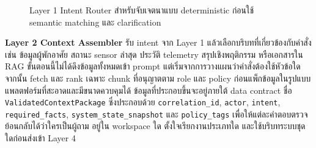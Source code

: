 \begin{figure}[!htbp]
    \centering
    \caption{Layer 1 Intent Router สำหรับจับเจตนาแบบ deterministic ก่อนใช้ semantic matching และ clarification}
    \label{fig:ch3_ai_intent_router}
\end{figure}
\FloatBarrier

\textbf{Layer 2 Context Assembler} รับ intent จาก Layer 1 แล้วเลือกบริบทที่เกี่ยวข้องกับคำสั่ง เช่น ข้อมูลผู้พักอาศัย สถานะ sensor ล่าสุด ประวัติ telemetry สรุปเชิงพฤติกรรม หรือเอกสารใน RAG ขั้นตอนนี้ไม่ได้ดึงข้อมูลทั้งหมดเข้า prompt แต่เริ่มจากการวางแผนว่าคำสั่งต้องใช้หัวข้อใด จากนั้น fetch และ rank เฉพาะ chunk ที่อนุญาตตาม role และ policy ก่อนแพ็กข้อมูลในรูปแบบแพลตฟอร์มที่สะอาดและมีขนาดควบคุมได้ ข้อมูลที่ประกอบขึ้นจะอยู่ภายใต้ data contract ชื่อ \texttt{ValidatedContextPackage} ซึ่งประกอบด้วย \texttt{correlation\_id}, \texttt{actor}, \texttt{intent}, \texttt{required\_facts}, \texttt{system\_state\_snapshot} และ \texttt{policy\_tags} เพื่อให้แต่ละคำตอบตรวจย้อนกลับได้ว่าใครเป็นผู้ถาม อยู่ใน workspace ใด ตั้งใจเรียกงานประเภทใด และใช้บริบทระบบชุดใดก่อนส่งเข้า Layer 4


